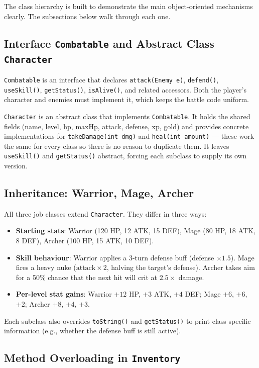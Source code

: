 \documentclass[12pt,a4paper]{article}
\begin{document}
The class hierarchy is built to demonstrate the main object-oriented mechanisms clearly. The subsections below walk through each one.

\subsection*{Interface \texttt{Combatable} and Abstract Class \texttt{Character}}

\texttt{Combatable} is an interface that declares \texttt{attack(Enemy e)}, \texttt{defend()}, \texttt{useSkill()}, \texttt{getStatus()}, \texttt{isAlive()}, and related accessors. Both the player's character and enemies must implement it, which keeps the battle code uniform.

\texttt{Character} is an abstract class that implements \texttt{Combatable}. It holds the shared fields (name, level, hp, maxHp, attack, defense, xp, gold) and provides concrete implementations for \texttt{takeDamage(int dmg)} and \texttt{heal(int amount)} --- these work the same for every class so there is no reason to duplicate them. It leaves \texttt{useSkill()} and \texttt{getStatus()} abstract, forcing each subclass to supply its own version.

\subsection*{Inheritance: Warrior, Mage, Archer}

All three job classes extend \texttt{Character}. They differ in three ways:
\begin{itemize}[leftmargin=*]
    \item \textbf{Starting stats}: Warrior (120 HP, 12 ATK, 15 DEF), Mage (80 HP, 18 ATK, 8 DEF), Archer (100 HP, 15 ATK, 10 DEF).
    \item \textbf{Skill behaviour}: Warrior applies a 3-turn defense buff (defense $\times 1.5$). Mage fires a heavy nuke ($\text{attack} \times 2$, halving the target's defense). Archer takes aim for a 50\% chance that the next hit will crit at $2.5\times$ damage.
    \item \textbf{Per-level stat gains}: Warrior $+12$ HP, $+3$ ATK, $+4$ DEF; Mage $+6$, $+6$, $+2$; Archer $+8$, $+4$, $+3$.
\end{itemize}
Each subclass also overrides \texttt{toString()} and \texttt{getStatus()} to print class-specific information (e.g., whether the defense buff is still active).

\subsection*{Method Overloading in \texttt{Inventory}}
\end{document}
